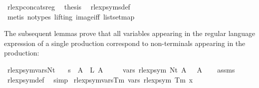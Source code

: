 \begin{isabellebody}
\ rlexp{\isacharunderscore}{\kern0pt}concats{\isacharunderscore}{\kern0pt}reg\ \isamarkupfalse%
\ {\isacharquery}{\kern0pt}thesis\ \isamarkupfalse%
\ rlexp{\isacharunderscore}{\kern0pt}syms{\isacharunderscore}{\kern0pt}def\isanewline
\ \ \ \ \isamarkupfalse%
\ {\isacharparenleft}{\kern0pt}metis\ {\isacharparenleft}{\kern0pt}no{\isacharunderscore}{\kern0pt}types{\isacharcomma}{\kern0pt}\ lifting{\isacharparenright}{\kern0pt}\ image{\isacharunderscore}{\kern0pt}iff\ list{\isachardot}{\kern0pt}set{\isacharunderscore}{\kern0pt}map{\isacharparenright}{\kern0pt}\isanewline
{}\isamarkupfalse%
%
\endisatagproof
{\isafoldproof}%
%
\isadelimproof
%
\endisadelimproof
%
\begin{isamarkuptext}%
The subsequent lemmas prove that all variables appearing in the regular language
expression of a single production correspond to non-terminals appearing in the production:%
\end{isamarkuptext}\isamarkuptrue%
\isamarkupfalse%
\ rlexp{\isacharunderscore}{\kern0pt}sym{\isacharunderscore}{\kern0pt}vars{\isacharunderscore}{\kern0pt}Nt{\isacharcolon}{\kern0pt}\isanewline
\ \ \ {\isachardoublequoteopen}s\ {\isacharparenleft}{\kern0pt}{\isasymgamma}{\isacharprime}{\kern0pt}\ A{\isacharparenright}{\kern0pt}\ {\isacharequal}{\kern0pt}\ L\ A{\isachardoublequoteclose}\isanewline
\ \ \ \ \ {\isachardoublequoteopen}vars\ {\isacharparenleft}{\kern0pt}rlexp{\isacharunderscore}{\kern0pt}sym\ {\isacharparenleft}{\kern0pt}Nt\ A{\isacharparenright}{\kern0pt}{\isacharparenright}{\kern0pt}\ {\isacharequal}{\kern0pt}\ {\isacharbraceleft}{\kern0pt}{\isasymgamma}{\isacharprime}{\kern0pt}\ A{\isacharbraceright}{\kern0pt}{\isachardoublequoteclose}\isanewline
%
\isadelimproof
\ \ %
\endisadelimproof
%
\isatagproof
{}\isamarkupfalse%
\ assms\ \isamarkupfalse%
\ rlexp{\isacharunderscore}{\kern0pt}sym{\isacharunderscore}{\kern0pt}def\ \isamarkupfalse%
\ simp%
\endisatagproof
{\isafoldproof}%
%
\isadelimproof
\isanewline
%
\endisadelimproof
\isanewline
{}\isamarkupfalse%
\ rlexp{\isacharunderscore}{\kern0pt}sym{\isacharunderscore}{\kern0pt}vars{\isacharunderscore}{\kern0pt}Tm{\isacharcolon}{\kern0pt}\ {\isachardoublequoteopen}vars\ {\isacharparenleft}{\kern0pt}rlexp{\isacharunderscore}{\kern0pt}sym\ {\isacharparenleft}{\kern0pt}Tm\ x{\isacharparenright}{\kern0pt}{\isacharparenright}{\kern0pt}\ {\isacharequal}{\kern0pt}\ {\isacharbraceleft}{\kern0pt}{\isacharbraceright}{\kern0pt}{\isachardoublequoteclose}\isanewline

\end{isabellebody}
